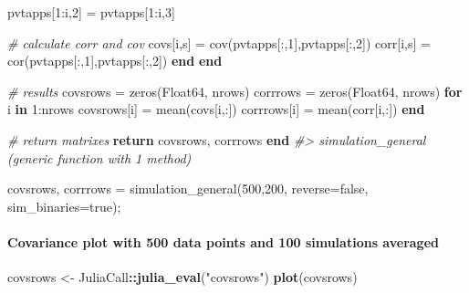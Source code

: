 \documentclass[]{article}
\newenvironment{Shaded}{\begin{snugshade}}{\end{snugshade}}
\newcommand{\CommentTok}[1]{\textcolor[rgb]{0.56,0.35,0.01}{\textit{#1}}}
\newcommand{\DataTypeTok}[1]{\textcolor[rgb]{0.13,0.29,0.53}{#1}}
\newcommand{\FloatTok}[1]{\textcolor[rgb]{0.00,0.00,0.81}{#1}}
\newcommand{\KeywordTok}[1]{\textcolor[rgb]{0.13,0.29,0.53}{\textbf{#1}}}
\newcommand{\NormalTok}[1]{#1}
\newcommand{\OperatorTok}[1]{\textcolor[rgb]{0.81,0.36,0.00}{\textbf{#1}}}
\newcommand{\StringTok}[1]{\textcolor[rgb]{0.31,0.60,0.02}{#1}}
\let\oldparagraph\paragraph
\renewcommand{\paragraph}[1]{\oldparagraph{#1}\mbox{}}
\begin{document}
\begin{Shaded}
\begin{Highlighting}[]
\NormalTok{            pvtapps[}\FloatTok{1}\NormalTok{:i,}\FloatTok{2}\NormalTok{] = pvtapps[}\FloatTok{1}\NormalTok{:i,}\FloatTok{3}\NormalTok{]}

            \CommentTok{# calculate corr and cov}
\NormalTok{            covs[i,s] = cov(pvtapps[:,}\FloatTok{1}\NormalTok{],pvtapps[:,}\FloatTok{2}\NormalTok{])}
\NormalTok{            corr[i,s] = cor(pvtapps[:,}\FloatTok{1}\NormalTok{],pvtapps[:,}\FloatTok{2}\NormalTok{])}
        \KeywordTok{end}
    \KeywordTok{end}

    \CommentTok{# results}
\NormalTok{    covsrows = zeros(}\DataTypeTok{Float64}\NormalTok{, nrows)}
\NormalTok{    corrrows = zeros(}\DataTypeTok{Float64}\NormalTok{, nrows)}
    \KeywordTok{for}\NormalTok{ i }\KeywordTok{in} \FloatTok{1}\NormalTok{:nrows}
\NormalTok{        covsrows[i] = mean(covs[i,:])}
\NormalTok{        corrrows[i] = mean(corr[i,:])}
    \KeywordTok{end}

    \CommentTok{# return matrixes}
    \KeywordTok{return}\NormalTok{ covsrows, corrrows}
\KeywordTok{end}
\CommentTok{#> simulation_general (generic function with 1 method)}
\end{Highlighting}
\end{Shaded}

\begin{Shaded}
\begin{Highlighting}[]
\NormalTok{covsrows, corrrows = simulation_general(}\FloatTok{500}\NormalTok{,}\FloatTok{200}\NormalTok{, reverse=false, sim_binaries=true);}
\end{Highlighting}
\end{Shaded}

\newpage

\hypertarget{covariance-plot-with-500-data-points-and-100-simulations-averaged}{%
\paragraph{Covariance plot with 500 data points and 100 simulations
averaged}\label{covariance-plot-with-500-data-points-and-100-simulations-averaged}}

\begin{Shaded}
\begin{Highlighting}[]
\NormalTok{covsrows <-}\StringTok{ }\NormalTok{JuliaCall}\OperatorTok{::}\KeywordTok{julia_eval}\NormalTok{(}\StringTok{"covsrows"}\NormalTok{)}
\KeywordTok{plot}\NormalTok{(covsrows)}
\end{Highlighting}
\end{Shaded}
\end{document}
